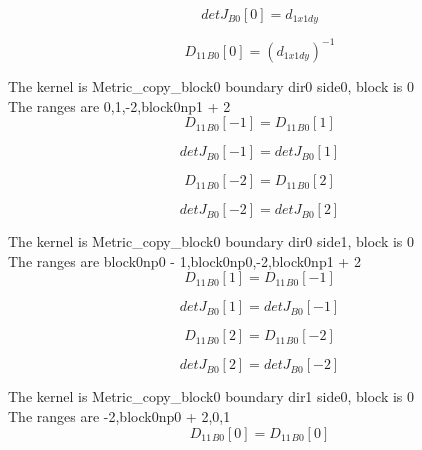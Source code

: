 \documentclass{article}
\begin{document}
\begin{dmath}{detJ{_{B0}}}[{0}] = d_{1 x1 dy}\end{dmath}

\begin{dmath}{D_{11}{_{B0}}}[{0}] = \left(d_{1 x1 dy} \right)^{-1}\end{dmath}

\noindent The kernel is Metric_copy_block0 boundary dir0 side0, block is 0\\\noindent The ranges are 0,1,-2,block0np1 + 2\\\begin{dmath}{D_{11}{_{B0}}}[{-1}] = {D_{11}{_{B0}}}[{1}]\end{dmath}

\begin{dmath}{detJ{_{B0}}}[{-1}] = {detJ{_{B0}}}[{1}]\end{dmath}

\begin{dmath}{D_{11}{_{B0}}}[{-2}] = {D_{11}{_{B0}}}[{2}]\end{dmath}

\begin{dmath}{detJ{_{B0}}}[{-2}] = {detJ{_{B0}}}[{2}]\end{dmath}

\noindent The kernel is Metric_copy_block0 boundary dir0 side1, block is 0\\\noindent The ranges are block0np0 - 1,block0np0,-2,block0np1 + 2\\\begin{dmath}{D_{11}{_{B0}}}[{1}] = {D_{11}{_{B0}}}[{-1}]\end{dmath}

\begin{dmath}{detJ{_{B0}}}[{1}] = {detJ{_{B0}}}[{-1}]\end{dmath}

\begin{dmath}{D_{11}{_{B0}}}[{2}] = {D_{11}{_{B0}}}[{-2}]\end{dmath}

\begin{dmath}{detJ{_{B0}}}[{2}] = {detJ{_{B0}}}[{-2}]\end{dmath}

\noindent The kernel is Metric_copy_block0 boundary dir1 side0, block is 0\\\noindent The ranges are -2,block0np0 + 2,0,1\\\begin{dmath}{D_{11}{_{B0}}}[{0}] = {D_{11}{_{B0}}}[{0}]\end{dmath}
\end{document}
